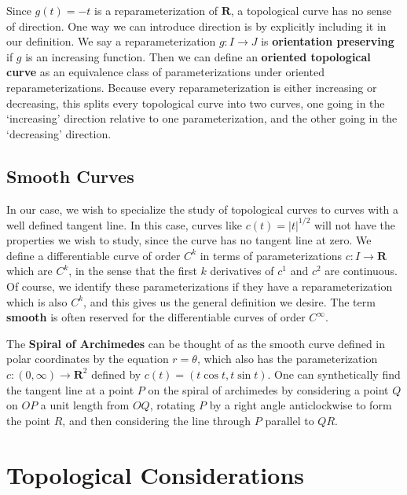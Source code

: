 Since $g(t) = -t$ is a reparameterization of $\mathbf{R}$, a topological curve has no sense of direction. One way we can introduce direction is by explicitly including it in our definition. We say a reparameterization $g: I \to J$ is {\bf orientation preserving} if $g$ is an increasing function. Then we can define an {\bf oriented topological curve} as an equivalence class of parameterizations under oriented reparameterizations. Because every reparameterization is either increasing or decreasing, this splits every topological curve into two curves, one going in the `increasing' direction relative to one parameterization, and the other going in the `decreasing' direction.

\section{Smooth Curves}

In our case, we wish to specialize the study of topological curves to curves with a well defined tangent line. In this case, curves like $c(t) = |t|^{1/2}$ will not have the properties we wish to study, since the curve has no tangent line at zero. We define a differentiable curve of order $C^k$  in terms of parameterizations $c: I \to \mathbf{R}$ which are $C^k$, in the sense that the first $k$ derivatives of $c^1$ and $c^2$ are continuous. Of course, we identify these parameterizations if they have a reparameterization which is also $C^k$, and this gives us the general definition we desire. The term {\bf smooth} is often reserved for the differentiable curves of order $C^\infty$.

\begin{example}
    The {\bf Spiral of Archimedes} can be thought of as the smooth curve defined in polar coordinates by the equation $r = \theta$, which also has the parameterization $c: (0,\infty) \to \mathbf{R}^2$ defined by $c(t) = (t \cos t, t \sin t)$. One can synthetically find the tangent line at a point $P$ on the spiral of archimedes by considering a point $Q$ on $OP$ a unit length from $OQ$, rotating $P$ by a right angle anticlockwise to form the point $R$, and then considering the line through $P$ parallel to $QR$.
\end{example}


\chapter{Topological Considerations}

